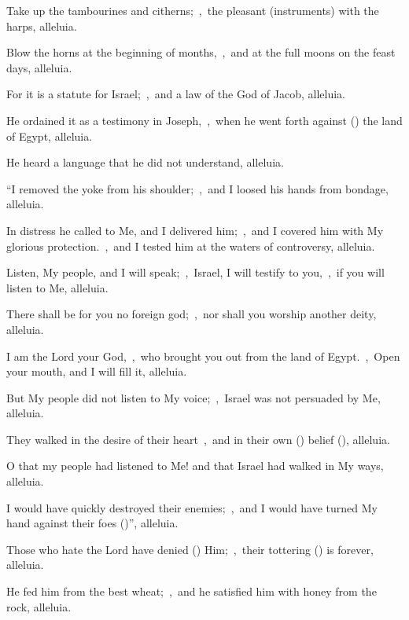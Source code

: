 \documentclass[12pt,twoside,a5paper]{article}
\begin{document}
\begin{halfparskip}
  Take up the tambourines and citherns;~\sep\ the pleasant (instruments) with the harps, alleluia.

  Blow the horns at the beginning of months,~\sep\ and at the full moons on the feast days, alleluia.

  For it is a statute for Israel;~\sep\ and a law of the God of Jacob, alleluia.

  He ordained it as a testimony in Joseph,~\sep\ when he went forth against () the land of Egypt, alleluia.

  He heard a language that he did not understand, alleluia.

  ``I removed the yoke from his shoulder;~\sep\ and I loosed his hands from bondage, alleluia.

  In distress he called to Me, and I delivered him;~\sep\ and I covered him with My glorious protection.~\sep\ and I tested him at the waters of controversy, alleluia.

  Listen, My people, and I will speak;~\sep\ Israel, I will testify to you,~\sep\ if you will listen to Me, alleluia.

  There shall be for you no foreign god;~\sep\ nor shall you worship another deity, alleluia.

  I am the Lord your God,~\sep\ who brought you out from the land of Egypt.~\sep\ Open your mouth, and I will fill it, alleluia.

  But My people did not listen to My voice;~\sep\ Israel was not persuaded by Me, alleluia.

  They walked in the desire of their heart~\sep\ and in their own () belief (), alleluia.

  O that my people had listened to Me! and that Israel had walked in My ways, alleluia.

  I would have quickly destroyed their enemies;~\sep\ and I would have turned My hand against their foes ()'', alleluia.

  Those who hate the Lord have denied () Him;~\sep\ their tottering () is forever, alleluia.

  He fed him from the best wheat;~\sep\ and he satisfied him with honey from the rock, alleluia.
\end{halfparskip}

\end{document}
